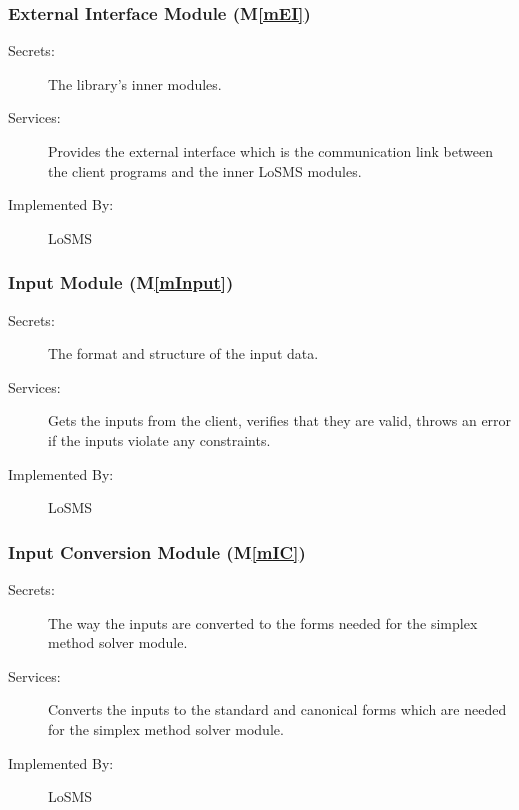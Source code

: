 \documentclass[12pt, titlepage]{article}
\newcommand{\mref}[1]{M\ref{#1}}
\newcommand{\famname}{LoSMS} %
\begin{document}
\subsubsection{External Interface Module (\mref{mEI})}

\begin{description}
	\item[Secrets:]The library's inner modules.
	\item[Services:]Provides the external interface which is the communication 
	link between the client programs and the inner \famname{}
        modules. 
	\item[Implemented By:] \famname{}
\end{description}

\subsubsection{Input Module (\mref{mInput})}

\begin{description}
	\item[Secrets:]The format and structure of the input data.
	\item[Services:]Gets the inputs from the client, verifies that they are 
	valid, 
	throws an error if the inputs violate any constraints.
	\item[Implemented By:] \famname{}
\end{description}

\subsubsection{Input Conversion Module (\mref{mIC})}

\begin{description}
	\item[Secrets:]The way the inputs are converted to the forms needed for the 
	simplex method solver module.
	\item[Services:]Converts the inputs to the standard and canonical forms 
	which are needed for the simplex method solver module.
	\item[Implemented By:] \famname{}
\end{description}
\end{document}
